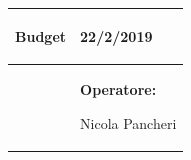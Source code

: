 \documentclass[a4paper]{article}
\begin{document}
                                  \begin{center}
                                  \begin{tabular}{|L{89mm} R{60mm}| }
                                  \hline
                                  \vspace{2.5mm}
                                  \begin{spacing}{0}
                                \textbf{Budget}
                                  \end{spacing}&
                                  \vspace{2.5mm}
                                  \begin{spacing}{0}

                                22/2/2019

                                  \end{spacing}\\
                                  \hline
                                  \vspace{2.5mm}
                                  \begin{spacing}{0}

                                
                                  \end{spacing} &
                                  \vspace{2.5mm}
                                  \begin{spacing}{0}
                                    \textbf{Operatore:}

                               Nicola Pancheri
                                  \end{spacing} \\
                                  \hline
                                  \end{tabular}
                                  \end{center}
                               
\end{document}
